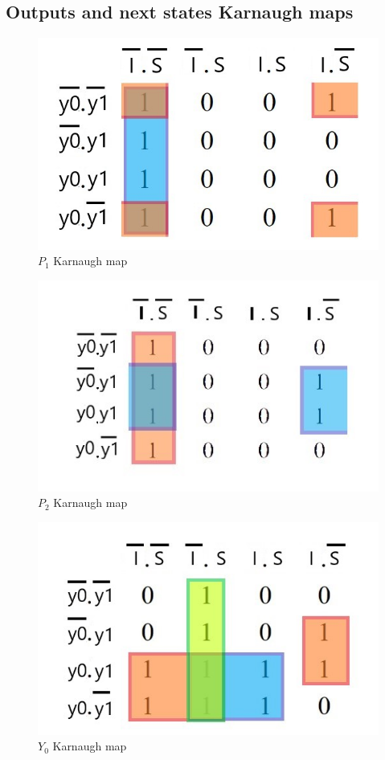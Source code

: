 \documentclass[../../e3_tp3_main.tex]{subfiles}
\begin{document}
\subsection{Outputs and next states Karnaugh maps}
\begin{figure}[H]
	\centering
	\includegraphics[scale=0.7]{figures/e3_tp3_ej1_mealy_b1_kmap.jpg}
	\caption{$P_1$ Karnaugh map}
\end{figure}
\begin{figure}[H]
	\centering
	\includegraphics[scale=1]{figures/e3_tp3_ej1_mealy_b2_kmap.jpg}
	\caption{$P_2$ Karnaugh map}
\end{figure}
\begin{figure}[H]
	\centering
	\includegraphics[scale=0.8]{figures/e3_tp3_ej1_mealy_y0_kmap.jpg}
	\caption{$Y_0$ Karnaugh map}
\end{figure}
\end{document}

